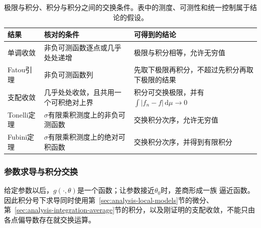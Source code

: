 \begin{table}[htbp]
 \centering\small
 \begin{tabularx}{\linewidth}{@{}lXX@{}}
 \toprule
 结果 & 核对的条件 & 可得到的结论\\
 \midrule
 单调收敛 & 非负可测函数逐点或几乎处处递增 & 极限与积分相等，允许无穷值\\
 Fatou引理 & 非负可测函数列 & 先取下极限再积分，不超过先积分再取下极限的结果\\
 支配收敛 & 几乎处处收敛，且共用一个可积绝对上界 & 积分可交换极限，并有$\int|f_n-f|\,\mathrm d\mu\to0$\\
 Tonelli定理 & $\sigma$有限乘积测度上的非负可测函数 & 交换积分次序，允许无穷值\\
 Fubini定理 & $\sigma$有限乘积测度上的绝对可积函数 & 交换积分次序，并得到有限积分\\
 \bottomrule
 \end{tabularx}
 \caption{极限与积分、积分与积分之间的交换条件。表中的测度、可测性和统一控制属于结论的假设。}
 \label{tab:analysis-interchange-conditions}
\end{table}

\subsubsection{参数求导与积分交换}

给定参数以后，$g(\cdot,\theta)$是一个函数；让参数接近$\theta_0$时，差商形成一族
逼近函数。因此积分号下求导同时使用第~\ref{sec:analysis-local-models}节的微分、
第~\ref{sec:analysis-integration-average}节的积分，以及刚证明的支配收敛，不能只由
各点偏导数存在就交换运算。


